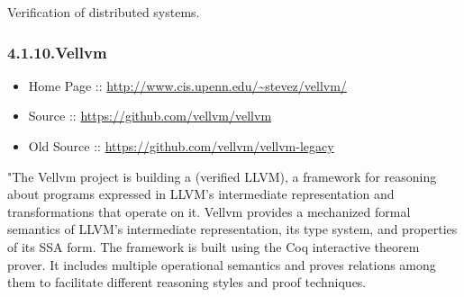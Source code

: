 \documentclass[12pt,twoside]{article}
\begin{document}
\noindent{}Verification of distributed systems.%

\subsubsection{4.1.10.\hspace*{0.5em}Vellvm}\label{sec-vellvm}%

\begin{itemize}[noitemsep,topsep=\mdcompacttopsep]%

\item{}Home Page :: \href{http://www.cis.upenn.edu/~stevez/vellvm/}{{\ttfamily http://\hspace{0pt}www.\hspace{0pt}cis.\hspace{0pt}upenn.\hspace{0pt}edu/\hspace{0pt}\textasciitilde{}stevez/\hspace{0pt}vellvm/\hspace{0pt}}}%

\item{}Source :: \href{https://github.com/vellvm/vellvm}{{\ttfamily https://\hspace{0pt}github.\hspace{0pt}com/\hspace{0pt}vellvm/\hspace{0pt}vellvm}}%

\item{}Old Source :: \href{https://github.com/vellvm/vellvm-legacy}{{\ttfamily https://\hspace{0pt}github.\hspace{0pt}com/\hspace{0pt}vellvm/\hspace{0pt}vellvm-\hspace{0pt}legacy}}%
\end{itemize}%

\noindent{}"The Vellvm project is building a (verified LLVM), a framework for
reasoning about programs expressed in LLVM's intermediate
representation and transformations that operate on it. Vellvm provides
a mechanized formal semantics of LLVM's intermediate representation,
its type system, and properties of its SSA form. The framework is
built using the Coq interactive theorem prover. It includes multiple
operational semantics and proves relations among them to facilitate
different reasoning styles and proof techniques.%
\end{document}
